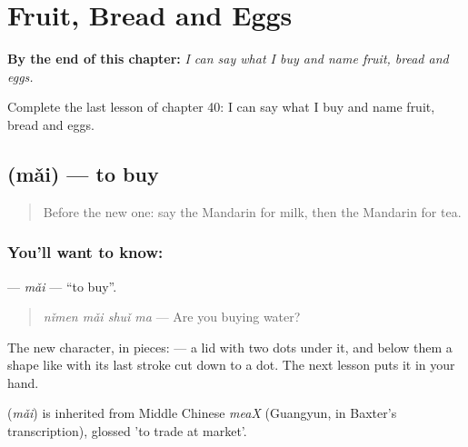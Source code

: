 
\chapter{Fruit, Bread and Eggs}
\label{ch:zh-fruit-bread-and-eggs}

\begin{chapteropening}
\textbf{By the end of this chapter:} \emph{I can say what I buy and name fruit, bread and eggs.}

Complete the last lesson of chapter 40: I can say what I buy and name fruit, bread and eggs.
\end{chapteropening}

\section[\texorpdfstring{\zh{买} (mǎi)}{买 (mǎi)}]{ (mǎi) — to buy}

\label{lesson:ZH-C40-mai}



\begin{quote}
Before the new one: say the Mandarin for milk, then the Mandarin for tea.
\end{quote}

\subsection*{You'll want to know: }
\textbf{} — \emph{mǎi} — \textquotedblleft{}to buy\textquotedblright{}.

\begin{quote}
\textbf{} \emph{nǐmen mǎi shuǐ ma} — Are you buying water?
\end{quote}

The new character, in pieces:  — a lid with two dots under it, and below them a shape like  with its last stroke cut down to a dot. The next lesson puts it in your hand.

\begin{cousinweb}
\textbf{} (\emph{mǎi}) is inherited from Middle Chinese \emph{meaX} (Guangyun, in Baxter's transcription), glossed 'to trade at market'.
\end{cousinweb}

